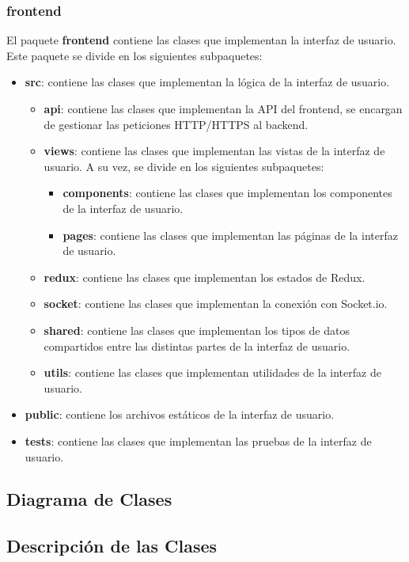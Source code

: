 \subsubsection{frontend}
El paquete \textbf{frontend} contiene las clases que implementan la interfaz de usuario. Este paquete se divide en los siguientes subpaquetes:
\begin{itemize} 
    \item \textbf{src}: contiene las clases que implementan la lógica de la interfaz de usuario.
    \begin{itemize}
        \item \textbf{api}: contiene las clases que implementan la API del frontend, se encargan de gestionar las peticiones HTTP/HTTPS al backend.
        \item \textbf{views}: contiene las clases que implementan las vistas de la interfaz de usuario. A su vez, se divide en los siguientes subpaquetes:
        \begin{itemize}
            \item \textbf{components}: contiene las clases que implementan los componentes de la interfaz de usuario.
            \item \textbf{pages}: contiene las clases que implementan las páginas de la interfaz de usuario.
        \end{itemize}
        \item \textbf{redux}: contiene las clases que implementan los estados de Redux.
        \item \textbf{socket}: contiene las clases que implementan la conexión con Socket.io.
        \item \textbf{shared}: contiene las clases que implementan los tipos de datos compartidos entre las distintas partes de la interfaz de usuario.
        \item \textbf{utils}: contiene las clases que implementan utilidades de la interfaz de usuario.
    \end{itemize}
    \item \textbf{public}: contiene los archivos estáticos de la interfaz de usuario.
    \item \textbf{tests}: contiene las clases que implementan las pruebas de la interfaz de usuario.
\end{itemize}

\subsection{Diagrama de Clases} 

\subsection{Descripción de las Clases}

